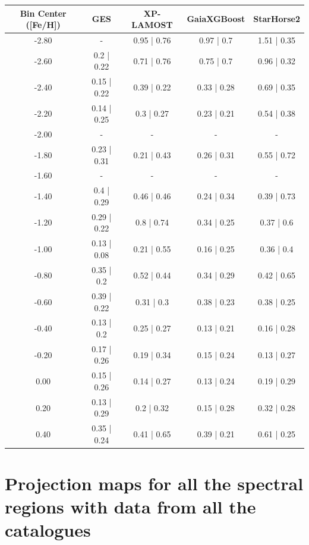 \documentclass{aa}
\begin{document}
\begin{appendix}
\begin{table}[!ht]
    \centering
    \begin{tabular}{c c c c c}
    \hline\hline
        Bin Center ([Fe/H]) & GES & XP-LAMOST & GaiaXGBoost & StarHorse2 \\
    \hline
        -2.80 & - & 0.95 | 0.76 & 0.97 | 0.7 & 1.51 | 0.35 \\ 
        -2.60 & 0.2 | 0.22 & 0.71 | 0.76 & 0.75 | 0.7 & 0.96 | 0.32 \\ 
        -2.40 & 0.15 | 0.22 & 0.39 | 0.22 & 0.33 | 0.28 & 0.69 | 0.35 \\ 
        -2.20 & 0.14 | 0.25 & 0.3 | 0.27 & 0.23 | 0.21 & 0.54 | 0.38 \\ 
        -2.00 & - & - & - & - \\ 
        -1.80 & 0.23 | 0.31 & 0.21 | 0.43 & 0.26 | 0.31 & 0.55 | 0.72 \\ 
        -1.60 & - & - & - & - \\ 
        -1.40 & 0.4 | 0.29 & 0.46 | 0.46 & 0.24 | 0.34 & 0.39 | 0.73 \\ 
        -1.20 & 0.29 | 0.22 & 0.8 | 0.74 & 0.34 | 0.25 & 0.37 | 0.6 \\ 
        -1.00 & 0.13 | 0.08 & 0.21 | 0.55 & 0.16 | 0.25 & 0.36 | 0.4 \\ 
        -0.80 & 0.35 | 0.2 & 0.52 | 0.44 & 0.34 | 0.29 & 0.42 | 0.65 \\ 
        -0.60 & 0.39 | 0.22 & 0.31 | 0.3 & 0.38 | 0.23 & 0.38 | 0.25 \\ 
        -0.40 & 0.13 | 0.2 & 0.25 | 0.27 & 0.13 | 0.21 & 0.16 | 0.28 \\ 
        -0.20 & 0.17 | 0.26 & 0.19 | 0.34 & 0.15 | 0.24 & 0.13 | 0.27 \\ 
        0.00 & 0.15 | 0.26 & 0.14 | 0.27 & 0.13 | 0.24 & 0.19 | 0.29 \\ 
        0.20 & 0.13 | 0.29 & 0.2 | 0.32 & 0.15 | 0.28 & 0.32 | 0.28 \\ 
        0.40 & 0.35 | 0.24 & 0.41 | 0.65 & 0.39 | 0.21 & 0.61 | 0.25 \\ 
    \hline

    \hline
    \end{tabular}
\end{table}

\section{Projection maps for all the spectral regions with data from all the catalogues}
\label{app:A}


\end{appendix}
\end{document}
